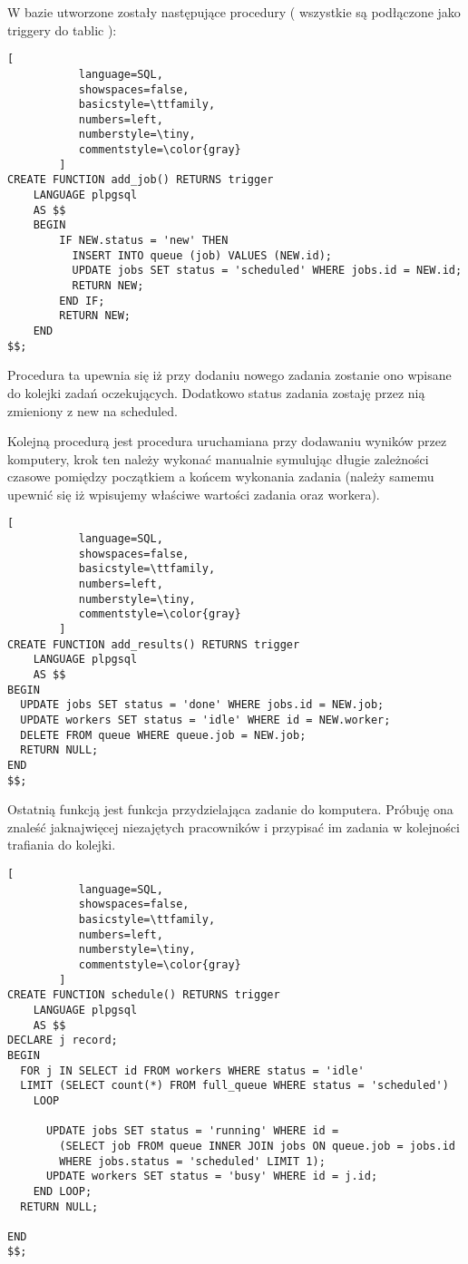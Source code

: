 \documentclass[paper=a4, fontsize=11pt]{scrartcl} %
\numberwithin{equation}{section} %
\numberwithin{figure}{section} %
\numberwithin{table}{section} %
\begin{document}
W bazie utworzone zostały następujące procedury ( wszystkie są podłączone jako triggery do tablic ):

\begin{lstlisting}[
           language=SQL,
           showspaces=false,
           basicstyle=\ttfamily,
           numbers=left,
           numberstyle=\tiny,
           commentstyle=\color{gray}
        ]
CREATE FUNCTION add_job() RETURNS trigger
    LANGUAGE plpgsql
    AS $$
    BEGIN
        IF NEW.status = 'new' THEN
          INSERT INTO queue (job) VALUES (NEW.id);
          UPDATE jobs SET status = 'scheduled' WHERE jobs.id = NEW.id;
          RETURN NEW;
        END IF;
        RETURN NEW;
    END
$$;

\end{lstlisting}

Procedura ta upewnia się iż przy dodaniu nowego zadania zostanie ono wpisane do kolejki zadań oczekujących.
Dodatkowo status zadania zostaję przez nią zmieniony z new na scheduled.



Kolejną procedurą jest procedura uruchamiana przy dodawaniu wyników przez komputery,
krok ten należy wykonać manualnie symulując długie zależności czasowe pomiędzy początkiem a końcem
wykonania zadania (należy samemu upewnić się iż wpisujemy właściwe wartości zadania oraz workera).

\begin{lstlisting}[
           language=SQL,
           showspaces=false,
           basicstyle=\ttfamily,
           numbers=left,
           numberstyle=\tiny,
           commentstyle=\color{gray}
        ]
CREATE FUNCTION add_results() RETURNS trigger
    LANGUAGE plpgsql
    AS $$
BEGIN
  UPDATE jobs SET status = 'done' WHERE jobs.id = NEW.job;
  UPDATE workers SET status = 'idle' WHERE id = NEW.worker;
  DELETE FROM queue WHERE queue.job = NEW.job;
  RETURN NULL;
END
$$;

\end{lstlisting}

Ostatnią funkcją jest funkcja przydzielająca zadanie do komputera.
Próbuję ona znaleść jaknajwięcej niezajętych pracowników i przypisać
im zadania w kolejności trafiania do kolejki.

\begin{lstlisting}[
           language=SQL,
           showspaces=false,
           basicstyle=\ttfamily,
           numbers=left,
           numberstyle=\tiny,
           commentstyle=\color{gray}
        ]
CREATE FUNCTION schedule() RETURNS trigger
    LANGUAGE plpgsql
    AS $$
DECLARE j record;
BEGIN
  FOR j IN SELECT id FROM workers WHERE status = 'idle' 
  LIMIT (SELECT count(*) FROM full_queue WHERE status = 'scheduled') 
    LOOP
      
      UPDATE jobs SET status = 'running' WHERE id = 
        (SELECT job FROM queue INNER JOIN jobs ON queue.job = jobs.id 
        WHERE jobs.status = 'scheduled' LIMIT 1);
      UPDATE workers SET status = 'busy' WHERE id = j.id;
    END LOOP;
  RETURN NULL;
  
END
$$;
\end{lstlisting}
\end{document}
